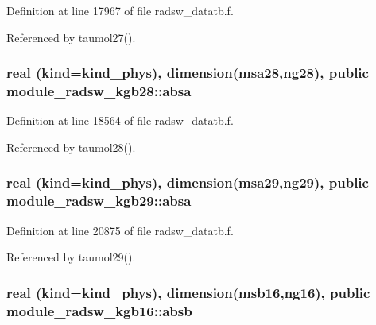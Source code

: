 Definition at line 17967 of file radsw\+\_\+datatb.\+f.



Referenced by taumol27().

\subsubsection[{\texorpdfstring{absa}{absa}}]{\setlength{\rightskip}{0pt plus 5cm}real (kind=kind\+\_\+phys), dimension(msa28,ng28), public module\+\_\+radsw\+\_\+kgb28\+::absa}\hypertarget{group__module__radsw__main_ga5e48daf035b3b22b6e1b0f36aabcec10}{}\label{group__module__radsw__main_ga5e48daf035b3b22b6e1b0f36aabcec10}


Definition at line 18564 of file radsw\+\_\+datatb.\+f.



Referenced by taumol28().

\subsubsection[{\texorpdfstring{absa}{absa}}]{\setlength{\rightskip}{0pt plus 5cm}real (kind=kind\+\_\+phys), dimension(msa29,ng29), public module\+\_\+radsw\+\_\+kgb29\+::absa}\hypertarget{group__module__radsw__main_ga1132fd19edc0312f6bcc905619f3bdfd}{}\label{group__module__radsw__main_ga1132fd19edc0312f6bcc905619f3bdfd}


Definition at line 20875 of file radsw\+\_\+datatb.\+f.



Referenced by taumol29().

\subsubsection[{\texorpdfstring{absb}{absb}}]{\setlength{\rightskip}{0pt plus 5cm}real (kind=kind\+\_\+phys), dimension(msb16,ng16), public module\+\_\+radsw\+\_\+kgb16\+::absb}\hypertarget{group__module__radsw__main_gafe8639128e4f7a48f133b7399addcb79}{}\label{group__module__radsw__main_gafe8639128e4f7a48f133b7399addcb79}


